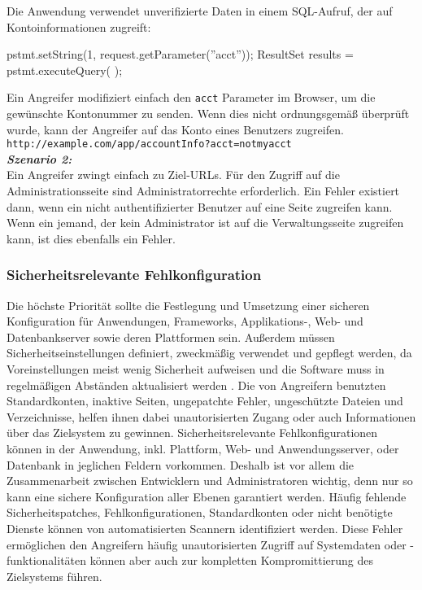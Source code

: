 Die Anwendung verwendet unverifizierte Daten in einem SQL-Aufruf, der auf Kontoinformationen zugreift\cite[11]{owasp17top10}:

\begin{LaTeXCode}[caption={Broken Access Control - Beispiel 1},captionpos=b, label=LaTeXCode:bac1][numbers=none]
pstmt.setString(1, request.getParameter(''acct''));
ResultSet results = pstmt.executeQuery( );
\end{LaTeXCode}

Ein Angreifer modifiziert einfach den \texttt{acct} Parameter im Browser, um die gewünschte Kontonummer zu senden. Wenn dies nicht ordnungsgemäß überprüft wurde, kann der Angreifer auf das Konto eines Benutzers zugreifen.\\

\texttt{http://example.com/app/accountInfo?acct=notmyacct}\\

\textbf{\textit{Szenario 2:}}\\

Ein Angreifer zwingt einfach zu Ziel-URLs. Für den Zugriff auf die Administrationsseite sind Administratorrechte erforderlich. Ein Fehler existiert dann, wenn ein nicht authentifizierter Benutzer auf eine Seite zugreifen kann. Wenn ein jemand, der kein Administrator ist auf die Verwaltungsseite zugreifen kann, ist dies ebenfalls ein Fehler\cite[11]{owasp17top10}.\\

\subsubsection{Sicherheitsrelevante Fehlkonfiguration}

Die höchste Priorität sollte die Festlegung und Umsetzung einer sicheren Konfiguration für Anwendungen, Frameworks, Applikations-, Web- und Datenbankserver sowie deren Plattformen sein. Außerdem müssen Sicherheitseinstellungen definiert, zweckmäßig verwendet und gepflegt werden, da Voreinstellungen meist wenig Sicherheit aufweisen und die Software muss in regelmäßigen Abständen aktualisiert werden \cite[6]{owasp17top10}. Die von Angreifern benutzten Standardkonten, inaktive Seiten, ungepatchte Fehler, ungeschützte Dateien und Verzeichnisse, helfen ihnen dabei unautorisierten Zugang oder auch Informationen über das Zielsystem zu gewinnen. Sicherheitsrelevante Fehlkonfigurationen können in der Anwendung, inkl. Plattform, Web- und Anwendungsserver, oder Datenbank in jeglichen Feldern vorkommen. Deshalb ist vor allem die Zusammenarbeit zwischen Entwicklern und Administratoren wichtig, denn nur so kann eine sichere Konfiguration aller Ebenen garantiert werden. Häufig fehlende Sicherheitspatches,
Fehlkonfigurationen, Standardkonten oder nicht benötigte Dienste können von automatisierten Scannern identifiziert werden. Diese Fehler ermöglichen den Angreifern häufig unautorisierten Zugriff auf Systemdaten oder -funktionalitäten können aber auch zur kompletten Kompromittierung des Zielsystems führen\cite[12]{owasp17top10}.\\

